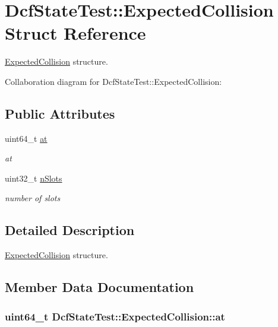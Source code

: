 \hypertarget{structDcfStateTest_1_1ExpectedCollision}{}\section{Dcf\+State\+Test\+:\+:Expected\+Collision Struct Reference}
\label{structDcfStateTest_1_1ExpectedCollision}


\hyperlink{structDcfStateTest_1_1ExpectedCollision}{Expected\+Collision} structure.  




Collaboration diagram for Dcf\+State\+Test\+:\+:Expected\+Collision\+:
\subsection*{Public Attributes}
\begin{DoxyCompactItemize}
\item 
uint64\+\_\+t \hyperlink{structDcfStateTest_1_1ExpectedCollision_ad6ea74dcd4abbb7e13cc364e2663893d}{at}
\begin{DoxyCompactList}\small\item\em at \end{DoxyCompactList}\item 
uint32\+\_\+t \hyperlink{structDcfStateTest_1_1ExpectedCollision_a508f27d63c14ecf00454af70a785afe9}{n\+Slots}
\begin{DoxyCompactList}\small\item\em number of slots \end{DoxyCompactList}\end{DoxyCompactItemize}


\subsection{Detailed Description}
\hyperlink{structDcfStateTest_1_1ExpectedCollision}{Expected\+Collision} structure. 

\subsection{Member Data Documentation}
\subsubsection[{\texorpdfstring{at}{at}}]{\setlength{\rightskip}{0pt plus 5cm}uint64\+\_\+t Dcf\+State\+Test\+::\+Expected\+Collision\+::at}\hypertarget{structDcfStateTest_1_1ExpectedCollision_ad6ea74dcd4abbb7e13cc364e2663893d}{}\label{structDcfStateTest_1_1ExpectedCollision_ad6ea74dcd4abbb7e13cc364e2663893d}


